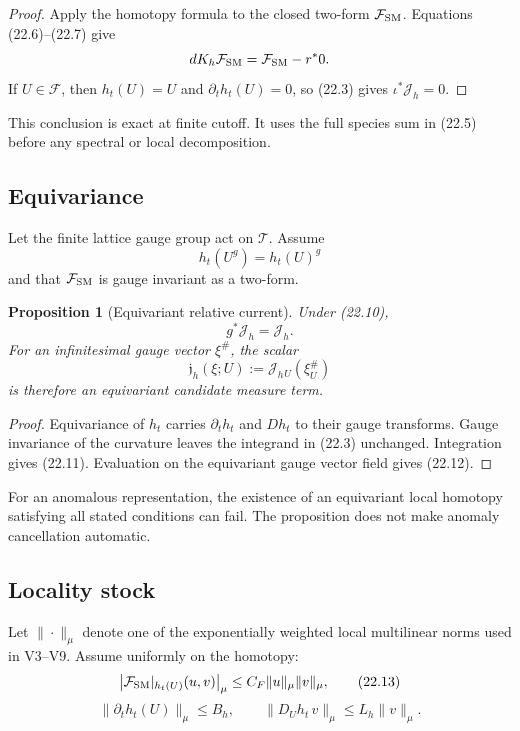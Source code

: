 \documentclass[11pt]{article}
\newtheorem{proposition}[theorem]{Proposition}
\begin{document}
\begin{proof}
Apply the homotopy formula to the closed two-form
\(\mathcal F_{\rm SM}\).  Equations (22.6)--(22.7) give
\[
 dK_h\mathcal F_{\rm SM}
 =
 \mathcal F_{\rm SM}-r^*0.
\]
If \(U\in\mathcal F\), then \(h_t(U)=U\) and
\(\partial_th_t(U)=0\), so (22.3) gives
\(\iota^*\mathcal J_h=0\).
\end{proof}

This conclusion is exact at finite cutoff.  It uses the full species sum
in (22.5) before any spectral or local decomposition.

\subsection{Equivariance}

Let the finite lattice gauge group act on \(\mathcal T\).  Assume
\[
 h_t(U^g)=h_t(U)^g
 \tag{22.10}
\]
and that \(\mathcal F_{\rm SM}\) is gauge invariant as a two-form.

\begin{proposition}[Equivariant relative current]
\label{prop:v11v22-equivariant}
Under (22.10),
\[
 g^*\mathcal J_h=\mathcal J_h.
 \tag{22.11}
\]
For an infinitesimal gauge vector \(\xi^\#\), the scalar
\[
 \mathfrak j_h(\xi;U):=
 \mathcal J_h{}_U(\xi^\#_U)
 \tag{22.12}
\]
is therefore an equivariant candidate measure term.
\end{proposition}

\begin{proof}
Equivariance of \(h_t\) carries \(\partial_th_t\) and \(D h_t\) to their
gauge transforms.  Gauge invariance of the curvature leaves the integrand
in (22.3) unchanged.  Integration gives (22.11).  Evaluation on the
equivariant gauge vector field gives (22.12).
\end{proof}

For an anomalous representation, the existence of an equivariant local
homotopy satisfying all stated conditions can fail.  The proposition does
not make anomaly cancellation automatic.

\subsection{Locality stock}

Let \(\|\cdot\|_\mu\) denote one of the exponentially weighted local
multilinear norms used in V3--V9.  Assume uniformly on the homotopy:
\[
 \left|
 \mathcal F_{\rm SM}|_{h_t(U)}(u,v)
 \right|_\mu
 \leq C_F\|u\|_\mu\|v\|_\mu,
 \tag{22.13}
\]
\[
 \|\partial_th_t(U)\|_\mu\leq B_h,
 \qquad
 \|D_Uh_t\,v\|_\mu\leq L_h\|v\|_\mu.
 \tag{22.14}
\]
\end{document}
